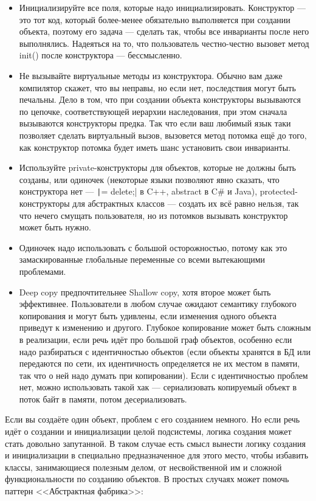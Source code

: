 \documentclass[a5paper]{article}
\begin{document}
\begin{itemize}
    \item Инициализируйте все поля, которые надо инициализировать. Конструктор --- это тот код, который более-менее обязательно выполняется при создании объекта, поэтому его задача --- сделать так, чтобы все инварианты после него выполнялись. Надеяться на то, что пользователь честно-честно вызовет метод init() после конструктора --- бессмысленно.
    \item Не вызывайте виртуальные методы из конструктора. Обычно вам даже компилятор скажет, что вы неправы, но если нет, последствия могут быть печальны. Дело в том, что при создании объекта конструкторы вызываются по цепочке, соответствующей иерархии наследования, при этом сначала вызываются конструкторы предка. Так что если ваш любимый язык таки позволяет сделать виртуальный вызов, вызовется метод потомка ещё до того, как конструктор потомка будет иметь шанс установить свои инварианты.
    \item Используйте private-конструкторы для объектов, которые не должны быть созданы, или одиночек (некоторые языки позволяют явно сказать, что конструктора нет --- \texttt|= delete;| в C++, abstract в C\# и Java), protected-конструкторы для абстрактных классов --- создать их всё равно нельзя, так что нечего смущать пользователя, но из потомков вызывать конструктор может быть нужно.
    \item Одиночек надо использовать с большой осторожностью, потому как это замаскированные глобальные переменные со всеми вытекающими проблемами.
    \item Deep copy предпочтительнее Shallow copy, хотя второе может быть эффективнее. Пользователи в любом случае ожидают семантику глубокого копирования и могут быть удивлены, если изменения одного объекта приведут к изменению и другого. Глубокое копирование может быть сложным в реализации, если речь идёт про большой граф объектов, особенно если надо разбираться с идентичностью объектов (если объекты хранятся в БД или передаются по сети, их идентичность определяется не их местом в памяти, так что о ней надо думать при копировании). Если с идентичностью проблем нет, можно использовать такой хак --- сериализовать копируемый объект в поток байт в памяти, потом десериализовать.
\end{itemize}

Если вы создаёте один объект, проблем с его созданием немного. Но если речь идёт о создании и инициализации целой подсистемы, логика создания может стать довольно запутанной. В таком случае есть смысл вынести логику создания и инициализации в специально предназначенное для этого место, чтобы избавить классы, занимающиеся полезным делом, от несвойственной им и сложной функциональности по созданию объектов. В простых случаях может помочь паттерн <<Абстрактная фабрика>>:
\end{document}
